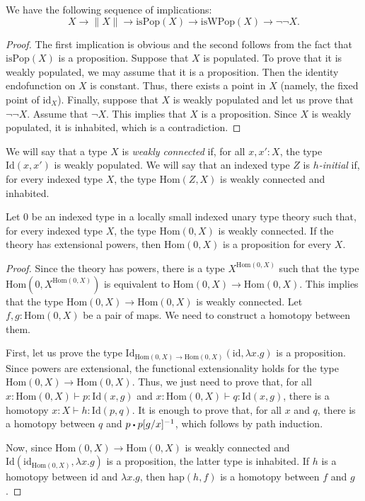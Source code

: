 \documentclass[reqno]{amsart}
\theoremstyle{definition}
\theoremstyle{remark}
\newcommand{\fs}[1]{\mathrm{#1}}
\newcommand{\Hom}{\fs{Hom}}
\newcommand{\Id}{\fs{Id}}
\newcommand{\sym}[1]{#1^{-1}}
\newcommand{\id}{\fs{id}}
\numberwithin{figure}{section}
\newcommand{\ct}{%
  \mathchoice{\mathbin{\raisebox{0.25ex}{$\displaystyle\centerdot$}}}%
             {\mathbin{\raisebox{0.25ex}{$\centerdot$}}}%
             {\mathbin{\raisebox{0.25ex}{$\scriptstyle\,\centerdot\,$}}}%
             {\mathbin{\raisebox{0.25ex}{$\scriptscriptstyle\,\centerdot\,$}}}
}
\begin{document}
\begin{prop}
We have the following sequence of implications:
\[ X \to \| X \| \to \mathrm{isPop}(X) \to \mathrm{isWPop}(X) \to \neg \neg X. \]
\end{prop}
\begin{proof}
The first implication is obvious and the second follows from the fact that $\mathrm{isPop}(X)$ is a proposition.
Suppose that $X$ is populated.
To prove that it is weakly populated, we may assume that it is a proposition.
Then the identity endofunction on $X$ is constant.
Thus, there exists a point in $X$ (namely, the fixed point of $\id_X$).
Finally, suppose that $X$ is weakly populated and let us prove that $\neg \neg X$.
Assume that $\neg X$.
This implies that $X$ is a proposition.
Since $X$ is weakly populated, it is inhabited, which is a contradiction.
\end{proof}

We will say that a type $X$ is \emph{weakly connected} if, for all $x, x' : X$, the type $\Id(x,x')$ is weakly populated.
We will say that an indexed type $Z$ is \emph{$h$-initial} if, for every indexed type $X$, the type $\Hom(Z,X)$ is weakly connected and inhabited.

\begin{prop}
Let $0$ be an indexed type in a locally small indexed unary type theory such that, for every indexed type $X$, the type $\Hom(0,X)$ is weakly connected.
If the theory has extensional powers, then $\Hom(0,X)$ is a proposition for every $X$.
\end{prop}
\begin{proof}
Since the theory has powers, there is a type $X^{\Hom(0,X)}$ such that the type $\Hom(0,X^{\Hom(0,X)})$ is equivalent to $\Hom(0,X) \to \Hom(0,X)$.
This implies that the type $\Hom(0,X) \to \Hom(0,X)$ is weakly connected.
Let $f,g : \Hom(0,X)$ be a pair of maps.
We need to construct a homotopy between them.

First, let us prove the type $\Id_{\Hom(0,X) \to \Hom(0,X)}(\id, \lambda x.g)$ is a proposition.
Since powers are extensional, the functional extensionality holds for the type $\Hom(0,X) \to \Hom(0,X)$.
Thus, we just need to prove that, for all $x : \Hom(0,X) \vdash p : \Id(x,g)$ and $x : \Hom(0,X) \vdash q : \Id(x,g)$, there is a homotopy $x : X \vdash h : \Id(p,q)$.
It is enough to prove that, for all $x$ and $q$, there is a homotopy between $q$ and $p \ct \sym{p[g/x]}$, which follows by path induction.

Now, since $\Hom(0,X) \to \Hom(0,X)$ is weakly connected and $\Id(\id_{\Hom(0,X)}, \lambda x.g)$ is a proposition, the latter type is inhabited.
If $h$ is a homotopy between $\id$ and $\lambda x.g$, then $\fs{hap}(h,f)$ is a homotopy between $f$ and $g$.
\end{proof}
\end{document}
